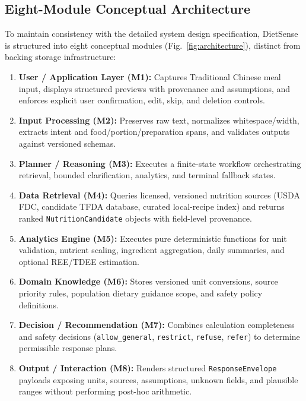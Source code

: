 \documentclass[conference]{IEEEtran}
\begin{document}
\subsection{Eight-Module Conceptual Architecture}
To maintain consistency with the detailed system design specification, DietSense is structured into eight conceptual modules (Fig.~\ref{fig:architecture}), distinct from backing storage infrastructure:
\begin{enumerate}
    \item \textbf{User / Application Layer (M1):} Captures Traditional Chinese meal input, displays structured previews with provenance and assumptions, and enforces explicit user confirmation, edit, skip, and deletion controls.
    \item \textbf{Input Processing (M2):} Preserves raw text, normalizes whitespace/width, extracts intent and food/portion/preparation spans, and validates outputs against versioned schemas.
    \item \textbf{Planner / Reasoning (M3):} Executes a finite-state workflow orchestrating retrieval, bounded clarification, analytics, and terminal fallback states.
    \item \textbf{Data Retrieval (M4):} Queries licensed, versioned nutrition sources (USDA FDC, candidate TFDA database, curated local-recipe index) and returns ranked \texttt{NutritionCandidate} objects with field-level provenance.
    \item \textbf{Analytics Engine (M5):} Executes pure deterministic functions for unit validation, nutrient scaling, ingredient aggregation, daily summaries, and optional REE/TDEE estimation.
    \item \textbf{Domain Knowledge (M6):} Stores versioned unit conversions, source priority rules, population dietary guidance scope, and safety policy definitions.
    \item \textbf{Decision / Recommendation (M7):} Combines calculation completeness and safety decisions (\texttt{allow\_general}, \texttt{restrict}, \texttt{refuse}, \texttt{refer}) to determine permissible response plans.
    \item \textbf{Output / Interaction (M8):} Renders structured \texttt{ResponseEnvelope} payloads exposing units, sources, assumptions, unknown fields, and plausible ranges without performing post-hoc arithmetic.
\end{enumerate}
\end{document}
